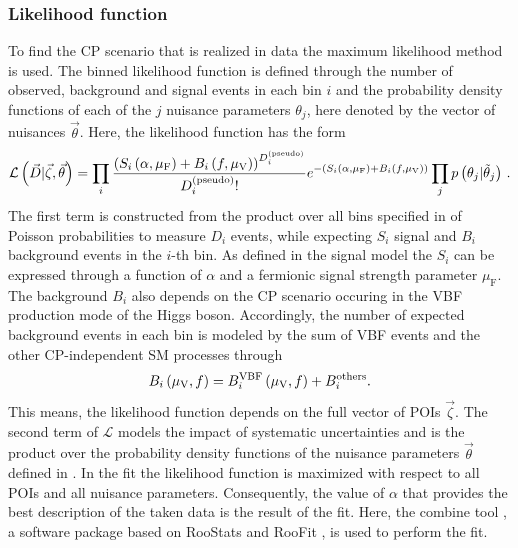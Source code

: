 \subsubsection{Likelihood function}
To find the CP scenario that is realized in data the maximum likelihood method is used. 
The binned likelihood function is defined through the number of observed, background and signal events in each bin $i$ and the probability density functions of each of the $j$ nuisance parameters $\theta_j$, here denoted by the vector of nuisances $\vec{\theta}$. 
Here, the likelihood function has the form 
\begin{equation}
    \mathcal{L}\li \vec{D} | \vec{\zeta}, \vec{\theta} \re = {\displaystyle \prod_{i}\frac{\li S_i \li \alpha, \mu_\text{F} \re + B_i \li f, \mu_\text{V} \re  \re^{D_i^\text{(pseudo)}}}{D_i^\text{(pseudo)}!} e^{ -\li S_i \li \alpha, \mu_\text{F} \re + B_i \li f, \mu_\text{V} \re \re } \prod_j p\li \theta_j | \tilde{\theta}_j \re }.
\end{equation}
The first term is constructed from the product over all bins specified in  of Poisson probabilities to measure $D_i$ events, while expecting $S_i$ signal and $B_i$ background events in the $i$-th bin. 
As defined in the signal model the $S_i$ can be expressed through a function of $\alpha$ and a fermionic signal strength parameter $\mu_\text{F}$. The background $B_i$ also depends on the CP scenario occuring in the VBF production mode of the Higgs boson. 
Accordingly, the number of expected background events in each bin is modeled by the sum of VBF events and the other CP-independent SM processes through
\begin{equation}
    B_i \left( \mu_\text{V}, f \right) = B_i^\text{VBF} \left( \mu_\text{V}, f  \right) + B_i^\text{others}.
\end{equation}
This means, the likelihood function  depends on the full vector of POIs $\vec{\zeta}$.\newline
The second term of $\mathcal{L}$ models the impact of systematic uncertainties and is the product over the probability density functions of the nuisance parameters $\vec{\theta}$ defined in .
In the fit the likelihood function is maximized with respect to all POIs and all nuisance parameters. Consequently, the value of $\alpha$ that provides the best description of the taken data is the result of the fit.
Here, the combine tool \cite{combinetool}, a software package based on RooStats \cite{Moneta:1289965} and RooFit \cite{Verkerke:2003ir}, is used to perform the fit.
